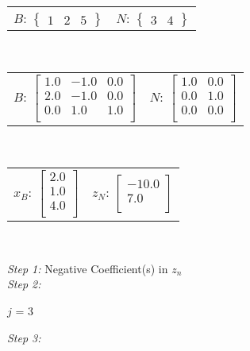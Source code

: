 \documentclass{article}
\begin{document}
\begin{center}
\begin{tabular}{cc}$B$: ${\left\{\begin{array}{ccc}1 & 2 & 5\end{array}\right\}}$ & $N$: ${\left\{\begin{array}{cc}3 & 4\end{array}\right\}}$\end{tabular}\\

\begin{tabular}{cc}$B$: $\left[\begin{array}{ccc}1.0 & -1.0 & 0.0\\ 2.0 & -1.0 & 0.0\\ 0.0 & 1.0 & 1.0\\ \end{array}\right]$ & $N$: $\left[\begin{array}{cc}1.0 & 0.0\\ 0.0 & 1.0\\ 0.0 & 0.0\\ \end{array}\right]$\end{tabular}\\

\begin{tabular}{cc}$x_B$: $\left[\begin{array}{c}2.0\\ 1.0\\ 4.0\\ \end{array}\right]$ & $z_N$: $\left[\begin{array}{c}-10.0\\ 7.0\\ \end{array}\right]$\end{tabular}\\

\end{center}
\textit{Step 1:}
Negative Coefficient(s) in $z_n$
\\\textit{Step 2:}\\
\begin{center}
$j$ = 3
\end{center}
\textit{Step 3:}\\
\end{document}
